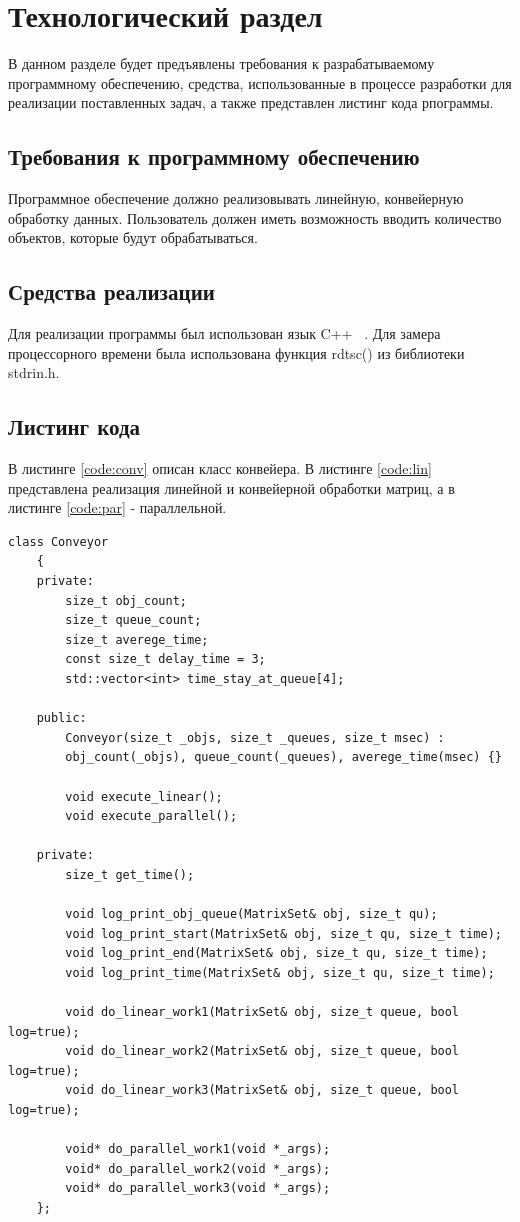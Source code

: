 \documentclass[12pt, a4paper]{report}
\begin{document}
	\newpage
	
	\chapter{Технологический раздел}
	\hspace{0.5cm}В данном разделе будет предъявлены требования к разрабатываемому программному обеспечению, средства, использованные в процессе разработки для реализации поставленных задач, а также представлен листинг кода рпограммы. 
	
	\section{Требования к программному обеспечению}
	\hspace{0.5cm}Программное обеспечение должно реализовывать линейную, конвейерную обработку данных. Пользователь должен иметь возможность вводить количество объектов, которые будут обрабатываться.
	\section{Средства реализации}
	\hspace{0.5cm}Для реализации программы был использован язык C++ ~\cite{CPP}. Для замера процессорного времени была использована функция rdtsc() из библиотеки stdrin.h.
	
	
	\section{Листинг кода}
	\hspace{0.5cm} В листинге \ref{code:conv} описан класс конвейера. В листинге \ref{code:lin} представлена реализация линейной и конвейерной обработки матриц, а в листинге \ref{code:par} - параллельной.
	
	\begin{lstlisting}[label=code:conv,caption=Класс конвейера]
	class Conveyor
	{
	private:
		size_t obj_count;
		size_t queue_count;
		size_t averege_time;
		const size_t delay_time = 3;
		std::vector<int> time_stay_at_queue[4];
	
	public:
		Conveyor(size_t _objs, size_t _queues, size_t msec) :
		obj_count(_objs), queue_count(_queues), averege_time(msec) {}
		
		void execute_linear();
		void execute_parallel();
	
	private:
		size_t get_time();
		
		void log_print_obj_queue(MatrixSet& obj, size_t qu);
		void log_print_start(MatrixSet& obj, size_t qu, size_t time);
		void log_print_end(MatrixSet& obj, size_t qu, size_t time);
		void log_print_time(MatrixSet& obj, size_t qu, size_t time);
		
		void do_linear_work1(MatrixSet& obj, size_t queue, bool log=true);
		void do_linear_work2(MatrixSet& obj, size_t queue, bool log=true);
		void do_linear_work3(MatrixSet& obj, size_t queue, bool log=true);
		
		void* do_parallel_work1(void *_args);
		void* do_parallel_work2(void *_args);
		void* do_parallel_work3(void *_args);
	};
	\end{lstlisting}
\end{document}
